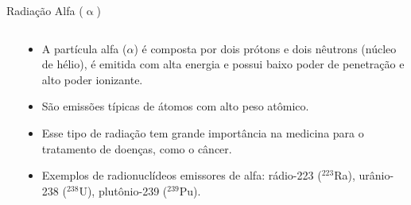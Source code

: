 \documentclass[presentation,professionalfonts,aspectratio=169]{beamer}
\begin{document}
\begin{frame}[label={sec:org020c26d}]{Radiação Alfa (\(\upalpha\))}
\begin{columns}
\begin{column}{0.45\columnwidth}
\end{column}


\begin{column}{0.45\columnwidth}
\begin{itemize}
\item A partícula alfa (\(\alpha\)) é composta por dois prótons e dois nêutrons (núcleo de hélio), é emitida com alta energia e possui baixo poder de penetração e alto poder ionizante.
\item São emissões típicas de átomos com alto peso atômico.
\item Esse tipo de radiação tem grande importância na medicina para o tratamento de doenças, como o câncer.
\item Exemplos de radionuclídeos emissores de alfa: rádio-223 (\(^{223}\)Ra), urânio-238 (\(^{238}\)U), plutônio-239 (\(^{239}\)Pu).
\end{itemize}
\end{column}
\end{columns}
\end{frame}
\end{document}
